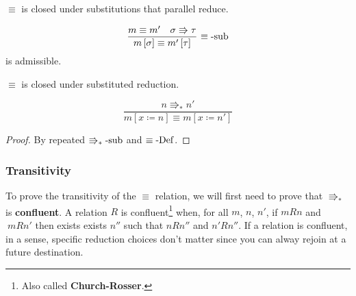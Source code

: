 \begin{lem} $\equiv$ is closed under substitutions that parallel reduce.

\[
\frac{m\equiv m'\quad\sigma\Rrightarrow\tau}{m\left[\sigma\right]\equiv m'\left[\tau\right]}\,\operatorname{\equiv-sub}
\]
is admissible.
\end{lem}
 
\begin{cor} $\equiv$ is closed under substituted reduction.

\[
\frac{n\Rrightarrow_{\ast}n'}{m\left[x\coloneqq n\right]\equiv m\left[x\coloneqq n'\right]}
\]
\end{cor}
\begin{proof}
By repeated $\operatorname{\Rrightarrow_{\ast}-sub}$ and $\equiv\operatorname{-Def}$.
\end{proof}
 
\subsubsection{Transitivity}
 
To prove the transitivity of the $\equiv$ relation, we will first need to prove that \textbf{$\Rrightarrow_{\ast}$ }is \textbf{confluent}.
A relation $R$ is confluent\footnote{
  Also called \textbf{Church-Rosser}.
} when, for all $m$, $n$, $n'$, if $mRn$ and $\:mRn'$ then exists exists $n''$ such that $nRn''$ and $n'Rn''$.
If a relation is confluent, in a sense, specific reduction choices don't matter since you can alway rejoin at a future destination.
 
